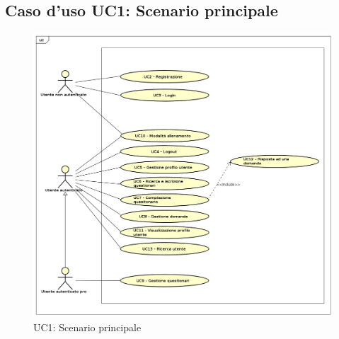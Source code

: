 \newpage
\subsection{Caso d'uso UC1: Scenario principale}

\label{UC1}
\begin{figure}
	\centering
	\includegraphics[scale=0.5]{UML/UC1.png}
	\caption{UC1: Scenario principale}
\end{figure}

